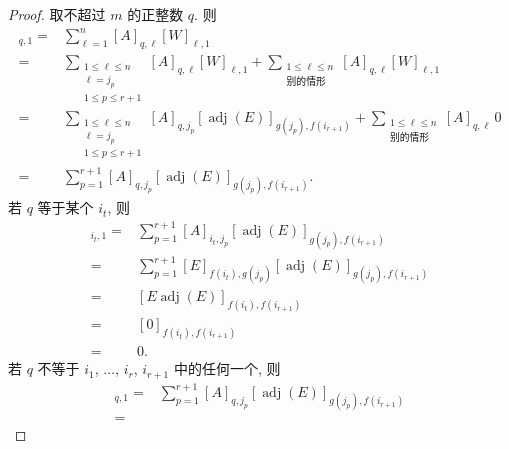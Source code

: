 \documentclass[../libro.tex]{subfiles}
\begin{document}
\begin{proof}
    取不超过 \(m\) 的正整数 \(q\).
    则
    \begin{align*}
        [AW]_{q,1}
        = {} &
        \sum_{\ell = 1}^{n}
        {[A]_{q,\ell} [W]_{\ell,1}}
        \\
        = {} &
        \sum_{\substack{
                1 \leq \ell \leq n \\
                \ell = j_p         \\
                1 \leq p \leq r+1
        }}
        {[A]_{q,\ell} [W]_{\ell,1}}
        +
        \sum_{\substack{
                1 \leq \ell \leq n \\
                \text{别的情形}
        }}
        {[A]_{q,\ell} [W]_{\ell,1}}
        \\
        = {} &
        \sum_{\substack{
                1 \leq \ell \leq n \\
                \ell = j_p         \\
                1 \leq p \leq r+1
        }}
        {[A]_{q,j_p}
        [\operatorname{adj} {(E)}]_{g(j_p),f(i_{r+1})}}
        +
        \sum_{\substack{
                1 \leq \ell \leq n \\
                \text{别的情形}
        }}
        {[A]_{q,\ell}\, 0}
        \\
        = {} &
        \sum_{p=1}^{r+1}
        {[A]_{q,j_p}
        [\operatorname{adj} {(E)}]_{g(j_p),f(i_{r+1})}}.
    \end{align*}
    若 \(q\) 等于某个 \(i_t\), 则
    \begin{align*}
        [AW]_{i_t,1}
        = {} &
        \sum_{p=1}^{r+1}
        {[A]_{i_t,j_p}
        [\operatorname{adj} {(E)}]_{g(j_p),f(i_{r+1})}}
        \\
        = {} &
        \sum_{p=1}^{r+1}
        {[E]_{f(i_t),g(j_p)}
        [\operatorname{adj} {(E)}]_{g(j_p),f(i_{r+1})}}
        \\
        = {} &
        [E \operatorname{adj} {(E)}]_{f(i_t),f(i_{r+1})}
        \\
        = {} &
        [0]_{f(i_t),f(i_{r+1})}
        \\
        = {} & 0.
    \end{align*}
    若 \(q\) 不等于
    \(i_1\), \(\dots\), \(i_r\), \(i_{r+1}\)
    中的任何一个,
    则
    \begin{align*}
        [AW]_{q,1}
        = {} &
        \sum_{p=1}^{r+1}
        {[A]_{q,j_p}
        [\operatorname{adj} {(E)}]_{g(j_p),f(i_{r+1})}}
        \\
        = {} &

\end{align*}
\end{proof}
\end{document}
